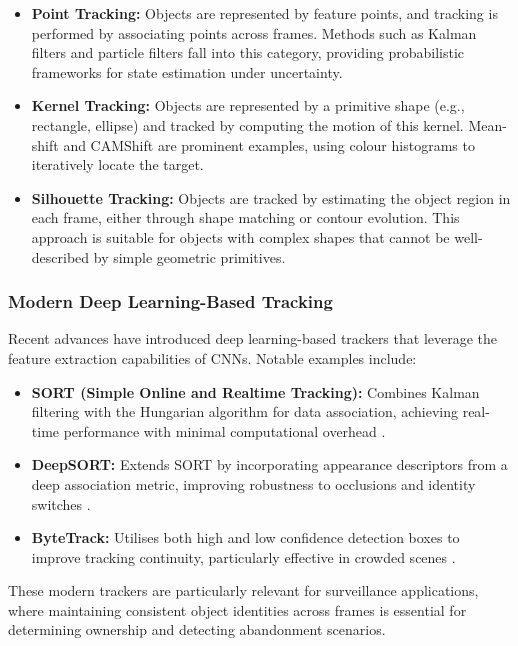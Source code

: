 \begin{itemize}
	\item \textbf{Point Tracking:} Objects are represented by feature points,
	      and tracking is performed by associating points across frames. Methods
	      such as Kalman filters and particle filters fall into this category,
	      providing probabilistic frameworks for state estimation under
	      uncertainty.
	\item \textbf{Kernel Tracking:} Objects are represented by a primitive shape
	      (e.g., rectangle, ellipse) and tracked by computing the motion of this
	      kernel. Mean-shift and CAMShift are prominent examples, using colour
	      histograms to iteratively locate the target.
	\item \textbf{Silhouette Tracking:} Objects are tracked by estimating the
	      object region in each frame, either through shape matching or contour
	      evolution. This approach is suitable for objects with complex shapes
	      that cannot be well-described by simple geometric primitives.
\end{itemize}

\subsubsection{Modern Deep Learning-Based Tracking}

Recent advances have introduced deep learning-based trackers that leverage the
feature extraction capabilities of CNNs. Notable examples include:

\begin{itemize}
	\item \textbf{SORT (Simple Online and Realtime Tracking):} Combines Kalman
	      filtering with the Hungarian algorithm for data association, achieving
	      real-time performance with minimal computational overhead
	      \citep{bewley2016simple}.
	\item \textbf{DeepSORT:} Extends SORT by incorporating appearance
	      descriptors from a deep association metric, improving robustness to
	      occlusions and identity switches \citep{wojke2017simple}.
	\item \textbf{ByteTrack:} Utilises both high and low confidence detection
	      boxes to improve tracking continuity, particularly effective in crowded
	      scenes \citep{zhang2022bytetrack}.
\end{itemize}

These modern trackers are particularly relevant for surveillance applications,
where maintaining consistent object identities across frames is essential for
determining ownership and detecting abandonment scenarios.

